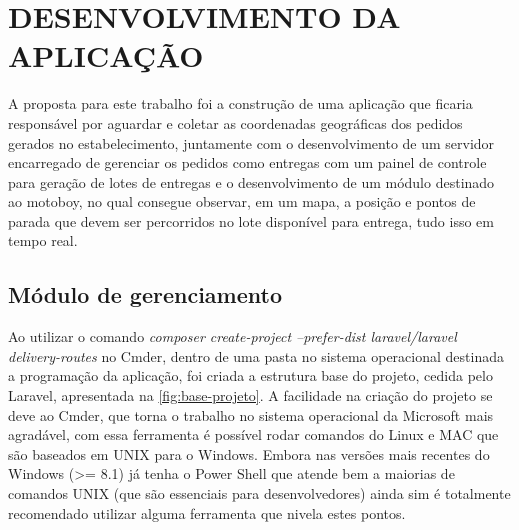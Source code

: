 
\chapter{DESENVOLVIMENTO DA APLICAÇÃO}
A proposta para este trabalho foi a construção de uma aplicação que ficaria responsável
por aguardar e coletar as coordenadas geográficas dos pedidos gerados no estabelecimento,
juntamente com o desenvolvimento de um servidor encarregado de gerenciar os pedidos como entregas
com um painel de controle para geração de lotes de entregas e o desenvolvimento de um módulo destinado ao motoboy, no qual consegue observar, em um mapa, a posição e pontos de parada que devem ser percorridos no lote disponível para entrega, tudo isso em tempo real.

\section{Módulo de gerenciamento}
Ao utilizar o comando \textit{composer create-project --prefer-dist laravel/laravel delivery-routes} no Cmder, dentro de uma pasta no sistema operacional destinada a programação da aplicação, foi criada a estrutura base do projeto, cedida pelo Laravel, apresentada na \autoref{fig:base-projeto}. A facilidade na criação do projeto se deve ao Cmder, que torna o trabalho no sistema operacional da Microsoft mais agradável, com essa ferramenta é possível rodar comandos do Linux e MAC que são baseados em UNIX para o Windows. Embora nas versões mais recentes do Windows (>= 8.1) já tenha o Power Shell que atende bem a maiorias de comandos UNIX (que são essenciais para desenvolvedores) ainda sim é totalmente recomendado utilizar alguma ferramenta que nivela estes pontos.

